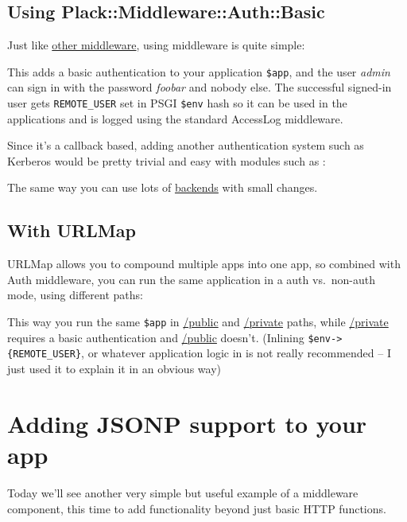 \section{Using
Plack::Middleware::Auth::Basic}\label{using-plackmiddlewareauthbasic}

Just like
\href{http://advent.plackperl.org/2009/12/day-10-using-plack-middleware.html}{other
middleware}, using  middleware is quite simple:


This adds a basic authentication to your application \lstinline!$app!,
and the user \emph{admin} can sign in with the password \emph{foobar}
and nobody else. The successful signed-in user gets
\lstinline!REMOTE_USER! set in PSGI \lstinline!$env! hash so it can be
used in the applications and is logged using the standard AccessLog
middleware.

Since it's a callback based, adding another authentication system such
as Kerberos would be pretty trivial and easy with modules such as
:


The same way you can use lots of
\href{http://search.cpan.org/search?query=authen+simple\&mode=all}{
backends} with small changes.

\section{With URLMap}\label{with-urlmap}

URLMap allows you to compound multiple apps into one app, so combined
with Auth middleware, you can run the same application in a auth
vs.~non-auth mode, using different paths:


This way you run the same \lstinline!$app! in \url{/public} and
\url{/private} paths, while \url{/private} requires a basic authentication
and \url{/public} doesn't. (Inlining \lstinline!$env->{REMOTE_USER}!, or
whatever application logic in  is not really recommended -- I just
used it to explain it in an obvious way)

\chapter{Adding JSONP support to your
app}\label{day-16-adding-jsonp-support-to-your-app}

Today we'll see another very simple but useful example of a middleware
component, this time to add functionality beyond just basic HTTP
functions.

